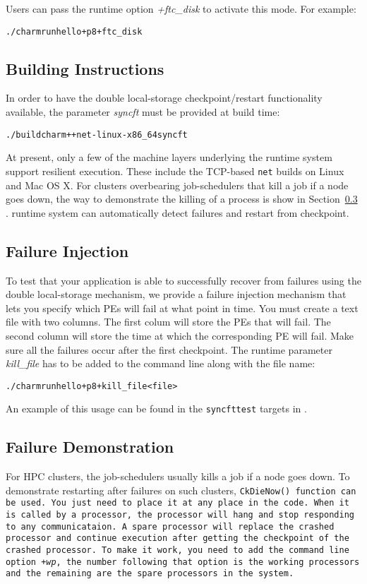 Users can pass the runtime option {\it +ftc\_disk} to activate this
mode.  For example:

\begin{alltt}
   ./charmrun hello +p8 +ftc_disk
\end{alltt} 

\subsection{Building Instructions}
In order to have the double local-storage checkpoint/restart
functionality available, the parameter \emph{syncft} must be provided
at build time:

\begin{alltt}
   ./build charm++ net-linux-x86_64 syncft
\end{alltt} 

At present, only a few of the machine layers underlying the \charmpp{}
runtime system support resilient execution. These include the
TCP-based \texttt{net} builds on Linux and Mac OS X. For clusters overbearing 
job-schedulers that kill a job if a node goes down, the way to demonstrate the killing 
of a process is show in Section~\ref{ft:inject} . 
\charmpp{} runtime system can automatically detect failures and restart from checkpoint.

\subsection{Failure Injection}
To test that your application is able to successfully recover from
failures using the double local-storage mechanism, we provide a
failure injection mechanism that lets you specify which PEs will fail
at what point in time. You must create a text file with two
columns. The first colum will store the PEs that will fail. The second
column will store the time at which the corresponding PE will
fail. Make sure all the failures occur after the first checkpoint. The
runtime parameter \emph{kill\_file} has to be added to the command
line along with the file name:

\begin{alltt}
   ./charmrun hello +p8 +kill_file <file>
\end{alltt} 

An example of this usage can be found in the \texttt{syncfttest}
targets in .

\subsection{Failure Demonstration}
\label{ft:inject}
For HPC clusters, the job-schedulers usually kills a job if a node goes down. To demonstrate
restarting after failures on such clusters, \tt{CkDieNow()} function can be used. You just need to place it at any place
in the code. When it is called by a processor, the processor will hang and stop responding to any communicataion.
A spare processor will replace the crashed processor and continue execution after getting the checkpoint of the crashed processor. 
To make it work, you need to add the command line option
\emph{+wp}, the number following that option is the working processors and the remaining 
are the spare processors in the system.
